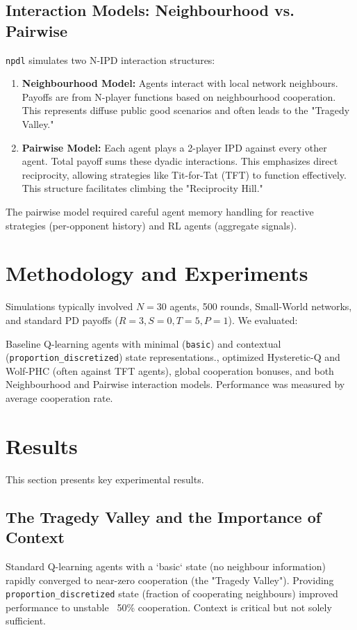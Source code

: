 \documentclass[]{llncs} %
\begin{document}
\subsection{Interaction Models: Neighbourhood vs. Pairwise}
\texttt{npdl} simulates two N-IPD interaction structures:
\begin{enumerate}
    \item \textbf{Neighbourhood Model:} Agents interact with local network neighbours. Payoffs are from N-player functions based on neighbourhood cooperation. This represents diffuse public good scenarios and often leads to the "Tragedy Valley."

    \item \textbf{Pairwise Model:} Each agent plays a 2-player IPD against every other agent. Total payoff sums these dyadic interactions. This emphasizes direct reciprocity, allowing strategies like Tit-for-Tat (TFT) to function effectively. This structure facilitates climbing the "Reciprocity Hill."
\end{enumerate}
The pairwise model required careful agent memory handling for reactive strategies (per-opponent history) and RL agents (aggregate signals).

\section{Methodology and Experiments}
\label{sec:methodology}
Simulations typically involved $N=30$ agents, 500 rounds, Small-World networks, and standard PD payoffs ($R=3, S=0, T=5, P=1$).
We evaluated: \item Baseline Q-learning agents with minimal (\texttt{basic}) and contextual (\texttt{proportion_discretized}) state representations., optimized Hysteretic-Q and Wolf-PHC (often against TFT agents), global cooperation bonuses, and both Neighbourhood and Pairwise interaction models. Performance was measured by average cooperation rate.

\section{Results}
\label{sec:results}
This section presents key experimental results.

\subsection{The Tragedy Valley and the Importance of Context}
Standard Q-learning agents with a `basic` state (no neighbour information) rapidly converged to near-zero cooperation (the "Tragedy Valley").
Providing \texttt{proportion_discretized} state (fraction of cooperating neighbours) improved performance to unstable ~50\% cooperation. Context is critical but not solely sufficient.
\end{document}
